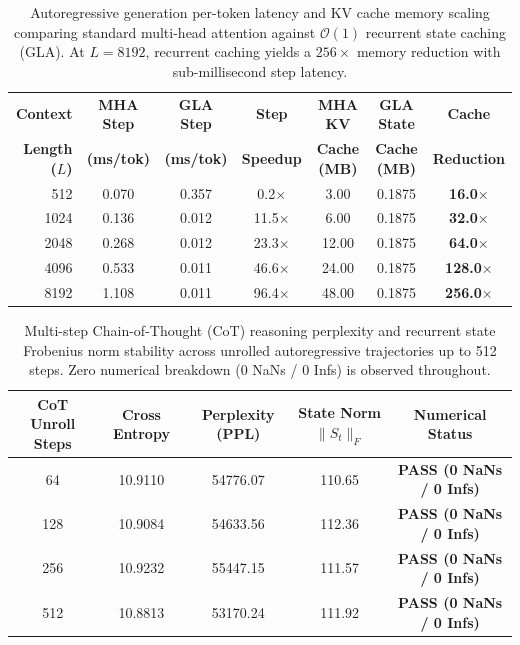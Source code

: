 \begin{table}[t]
\centering
\caption{Autoregressive generation per-token latency and KV cache memory scaling comparing standard multi-head attention against $\mathcal{O}(1)$ recurrent state caching (GLA). At $L=8192$, recurrent caching yields a $256\times$ memory reduction with sub-millisecond step latency.}
\label{tab:autoregressive_kv_scaling}
\small
\begin{tabular}{rcccccc}
\toprule
\textbf{Context} & \textbf{MHA Step} & \textbf{GLA Step} & \textbf{Step} & \textbf{MHA KV} & \textbf{GLA State} & \textbf{Cache} \\
\textbf{Length ($L$)} & \textbf{(ms/tok)} & \textbf{(ms/tok)} & \textbf{Speedup} & \textbf{Cache (MB)} & \textbf{Cache (MB)} & \textbf{Reduction} \\
\midrule
512 & 0.070 & 0.357 & 0.2$\times$ & 3.00 & 0.1875 & \textbf{16.0}$\times$ \\
1024 & 0.136 & 0.012 & 11.5$\times$ & 6.00 & 0.1875 & \textbf{32.0}$\times$ \\
2048 & 0.268 & 0.012 & 23.3$\times$ & 12.00 & 0.1875 & \textbf{64.0}$\times$ \\
4096 & 0.533 & 0.011 & 46.6$\times$ & 24.00 & 0.1875 & \textbf{128.0}$\times$ \\
8192 & 1.108 & 0.011 & 96.4$\times$ & 48.00 & 0.1875 & \textbf{256.0}$\times$ \\
\bottomrule
\end{tabular}
\end{table}

\begin{table}[t]
\centering
\caption{Multi-step Chain-of-Thought (CoT) reasoning perplexity and recurrent state Frobenius norm stability across unrolled autoregressive trajectories up to 512 steps. Zero numerical breakdown (0 NaNs / 0 Infs) is observed throughout.}
\label{tab:cot_perplexity_stability}
\small
\begin{tabular}{ccccc}
\toprule
\textbf{CoT Unroll Steps} & \textbf{Cross Entropy} & \textbf{Perplexity (PPL)} & \textbf{State Norm $\|S_t\|_F$} & \textbf{Numerical Status} \\
\midrule
64 & 10.9110 & 54776.07 & 110.65 & \textbf{PASS (0 NaNs / 0 Infs)} \\
128 & 10.9084 & 54633.56 & 112.36 & \textbf{PASS (0 NaNs / 0 Infs)} \\
256 & 10.9232 & 55447.15 & 111.57 & \textbf{PASS (0 NaNs / 0 Infs)} \\
512 & 10.8813 & 53170.24 & 111.92 & \textbf{PASS (0 NaNs / 0 Infs)} \\
\bottomrule
\end{tabular}
\end{table}

